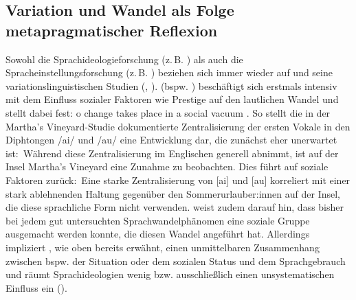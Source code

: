 \subsection{Variation und Wandel als Folge metapragmatischer Reflexion}
\label{sec:WandeldurchIndexikalitaet}
\largerpage
Sowohl die Sprachideologieforschung (z.\,B. \citealp{Eckert.2016}) als auch die Spracheinstellungsforschung (z.\,B. \citealp[12]{Hundt.1992}) beziehen sich immer wieder auf \citeauthor{Labov1963} und seine variationslinguistischen Studien (\citealp[etwa][]{Labov1963}, \citeyear{Labov2006}). 
\citeauthor{Labov1963} (bspw. \citeyear{Labov1963, Labov1973}) beschäftigt sich 
erstmals intensiv mit dem Einfluss sozialer Faktoren wie Prestige auf den lautlichen Wandel und stellt dabei fest: \glqq [N]o \mbox{change} takes place in a social vacuum\grqq{} \citep[274]{Labov1963}. 
So stellt die in der Martha's Vineyard-Studie dokumentierte Zentralisierung der ersten Vokale in den Diphtongen /ai/ und /au/ eine Entwicklung dar, die zunächst eher unerwartet ist:~W{\"a}hrend diese Zentralisierung im Englischen generell abnimmt, ist auf der Insel Martha's Vineyard eine Zunahme zu beobachten. 
Dies f{\"u}hrt \citet{Labov1963} auf soziale Faktoren zur{\"u}ck:~Eine starke Zentralisierung von [ai] und [au] korreliert mit einer stark ablehnenden Haltung gegen{\"u}ber den Sommerurlauber:innen auf der Insel, die diese sprachliche Form nicht verwenden.
\citet[223]{Labov1973} weist zudem darauf hin, dass bisher bei jedem gut untersuchten Sprachwandelph{\"a}nomen eine soziale Gruppe ausgemacht werden konnte, die diesen Wandel angef{\"u}hrt hat. 
Allerdings impliziert \citet{Labov2006}, wie oben bereits erwähnt, einen unmittelbaren Zusammenhang zwischen bspw. der Situation oder dem sozialen Status und dem Sprachgebrauch und räumt Sprachideologien wenig bzw. ausschließlich einen unsystematischen Einfluss ein (\cites[s.][70]{Woolard1994}[13]{Woolard1998}).

